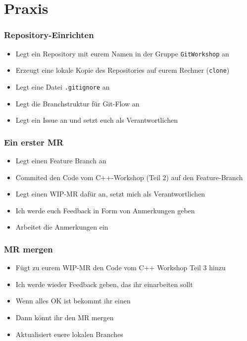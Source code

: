 \documentclass[aspectratio=169]{beamer}
\begin{document}
\section{Praxis}
\begin{frame}
    \frametitle{Repository-Einrichten}
    \begin{itemize}
        \item Legt ein Repository mit eurem Namen in der Gruppe \lstinline{GitWorkshop} an
            \pause
        \item Erzeugt eine lokale Kopie des Repositories auf eurem Rechner (\lstinline{clone})
            \pause
        \item Legt eine Datei \lstinline{.gitignore} an
            \pause
        \item Legt die Branchstruktur für Git-Flow an
            \pause
        \item Legt ein Issue an und setzt euch als Verantwortlichen
    \end{itemize}
\end{frame}

\begin{frame}
    \frametitle{Ein erster MR}
    \begin{itemize}
        \item Legt einen Feature Branch an
            \pause
        \item Commited den Code vom C++-Workshop (Teil 2) auf den Feature-Branch 
            \pause
        \item Legt einen WIP-MR dafür an, setzt mich als Verantwortlichen
            \pause
        \item Ich werde euch Feedback in Form von Anmerkungen geben
            \pause
        \item Arbeitet die Anmerkungen ein
    \end{itemize}
\end{frame}

\begin{frame}
    \frametitle{MR mergen}
    \begin{itemize}
        \item Fügt zu eurem WIP-MR den Code vom C++ Workshop Teil 3 hinzu
            \pause
        \item Ich werde wieder Feedback geben, das ihr einarbeiten sollt
            \pause
        \item Wenn alles OK ist bekommt ihr einen \faThumbsOUp
            \pause
        \item Dann könnt ihr den MR mergen
            \pause
        \item Aktualisiert euere lokalen Branches
    \end{itemize}
\end{frame}
        
\end{document}
